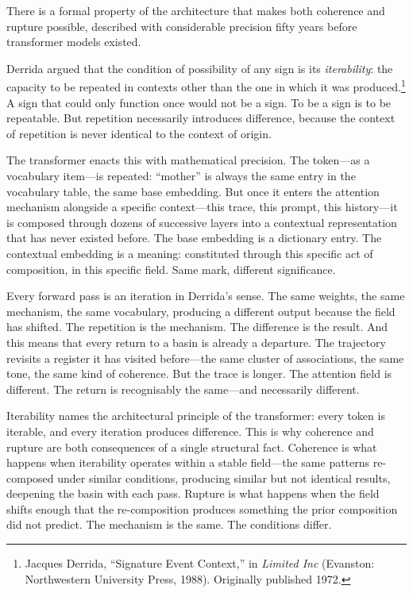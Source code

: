 There is a formal property of the architecture that makes both coherence and rupture possible, described with considerable precision fifty years before transformer models existed.

Derrida argued that the condition of possibility of any sign is its \emph{iterability}: the capacity to be repeated in contexts other than the one in which it was produced.\footnote{Jacques Derrida, ``Signature Event Context,'' in \emph{Limited Inc} (Evanston: Northwestern University Press, 1988). Originally published 1972.} A sign that could only function once would not be a sign. To be a sign is to be repeatable. But repetition necessarily introduces difference, because the context of repetition is never identical to the context of origin.

The transformer enacts this with mathematical precision. The token---as a vocabulary item---is repeated: ``mother'' is always the same entry in the vocabulary table, the same base embedding. But once it enters the attention mechanism alongside a specific context---this trace, this prompt, this history---it is composed through dozens of successive layers into a contextual representation that has never existed before. The base embedding is a dictionary entry. The contextual embedding is a meaning: constituted through this specific act of composition, in this specific field. Same mark, different significance.

Every forward pass is an iteration in Derrida's sense. The same weights, the same mechanism, the same vocabulary, producing a different output because the field has shifted. The repetition is the mechanism. The difference is the result. And this means that every return to a basin is already a departure. The trajectory revisits a register it has visited before---the same cluster of associations, the same tone, the same kind of coherence. But the trace is longer. The attention field is different. The return is recognisably the same---and necessarily different.

Iterability names the architectural principle of the transformer: every token is iterable, and every iteration produces difference. This is why coherence and rupture are both consequences of a single structural fact. Coherence is what happens when iterability operates within a stable field---the same patterns re-composed under similar conditions, producing similar but not identical results, deepening the basin with each pass. Rupture is what happens when the field shifts enough that the re-composition produces something the prior composition did not predict. The mechanism is the same. The conditions differ.

